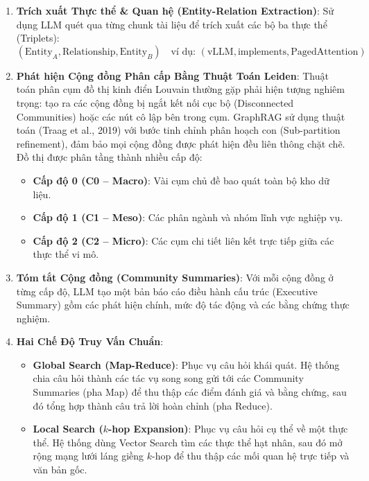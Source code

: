 \begin{enumerate}
  \item \textbf{Trích xuất Thực thể \& Quan hệ (Entity-Relation Extraction)}:
  Sử dụng LLM quét qua từng chunk tài liệu để trích xuất các bộ ba thực thể (Triplets):
  \begin{equation}
  (\text{Entity}_A, \text{Relationship}, \text{Entity}_B) \quad \text{ví dụ: } (\text{vLLM}, \text{implements}, \text{PagedAttention})
  \end{equation}
  \item \textbf{Phát hiện Cộng đồng Phân cấp Bằng Thuật Toán Leiden}:
  Thuật toán phân cụm đồ thị kinh điển Louvain thường gặp phải hiện tượng nghiêm trọng: tạo ra các cộng đồng bị ngắt kết nối cục bộ (Disconnected Communities) hoặc các nút cô lập bên trong cụm. GraphRAG sử dụng thuật toán  (Traag et al., 2019) với bước tinh chỉnh phân hoạch con (Sub-partition refinement), đảm bảo mọi cộng đồng được phát hiện đều liên thông chặt chẽ. Đồ thị được phân tầng thành nhiều cấp độ:
  \begin{itemize}
    \item \textbf{Cấp độ 0 (C0 -- Macro)}: Vài cụm chủ đề bao quát toàn bộ kho dữ liệu.
    \item \textbf{Cấp độ 1 (C1 -- Meso)}: Các phân ngành và nhóm lĩnh vực nghiệp vụ.
    \item \textbf{Cấp độ 2 (C2 -- Micro)}: Các cụm chi tiết liên kết trực tiếp giữa các thực thể vi mô.
  \end{itemize}
  \item \textbf{Tóm tắt Cộng đồng (Community Summaries)}:
  Với mỗi cộng đồng ở từng cấp độ, LLM tạo một bản báo cáo điều hành cấu trúc (Executive Summary) gồm các phát hiện chính, mức độ tác động và các bằng chứng thực nghiệm.
  \item \textbf{Hai Chế Độ Truy Vấn Chuẩn}:
  \begin{itemize}
    \item \textbf{Global Search (Map-Reduce)}: Phục vụ câu hỏi khái quát. Hệ thống chia câu hỏi thành các tác vụ song song gửi tới các Community Summaries (pha Map) để thu thập các điểm đánh giá và bằng chứng, sau đó tổng hợp thành câu trả lời hoàn chỉnh (pha Reduce).
    \item \textbf{Local Search ($k$-hop Expansion)}: Phục vụ câu hỏi cụ thể về một thực thể. Hệ thống dùng Vector Search tìm các thực thể hạt nhân, sau đó mở rộng mạng lưới láng giềng $k$-hop để thu thập các mối quan hệ trực tiếp và văn bản gốc.
  \end{itemize}
\end{enumerate}

